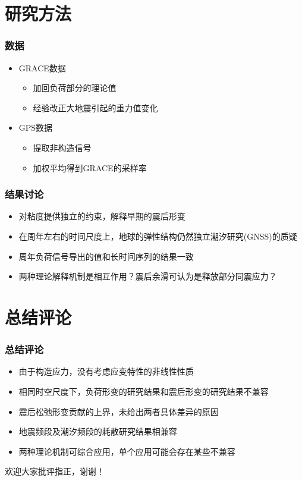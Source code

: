 \documentclass[12pt]{ctexbeamer}	%
\begin{document}

\section{研究方法}

\begin{frame}
\frametitle{数据}
\begin{itemize}
    \item<1-> GRACE数据
        \begin{itemize}
            \item 加回负荷部分的理论值
            \item 经验改正大地震引起的重力值变化
        \end{itemize}
    \item<2-> GPS数据
        \begin{itemize}
            \item 提取非构造信号
            \item 加权平均得到GRACE的采样率
        \end{itemize}
\end{itemize}
\end{frame}

\begin{frame}
\frametitle{结果讨论}
\begin{itemize}
    \item<1-> 对粘度提供独立的约束，解释早期的震后形变
    \item<2-> 在周年左右的时间尺度上，地球的弹性结构仍然独立潮汐研究(GNSS)的质疑 
    \item<3-> 周年负荷信号导出的值和长时间序列的结果一致
    \item<4-> 两种理论解释机制是相互作用？震后余滑可认为是释放部分同震应力？
\end{itemize}
\end{frame}


\section{总结评论}

\begin{frame}
\frametitle{总结评论}
\begin{itemize}
    \item<1-> 由于构造应力，没有考虑应变特性的非线性性质
    \item<2-> 相同时空尺度下，负荷形变的研究结果和震后形变的研究结果不兼容
    \item<3-> 震后松弛形变贡献的上界，未给出两者具体差异的原因
    \item<4-> 地震频段及潮汐频段的耗散研究结果相兼容
    \item<5-> 两种理论机制可综合应用，单个应用可能会存在某些不兼容
\end{itemize}
\end{frame}



\begin{frame}
\centerline{\Large 欢迎大家批评指正，谢谢！}
\end{frame}
\end{document}
